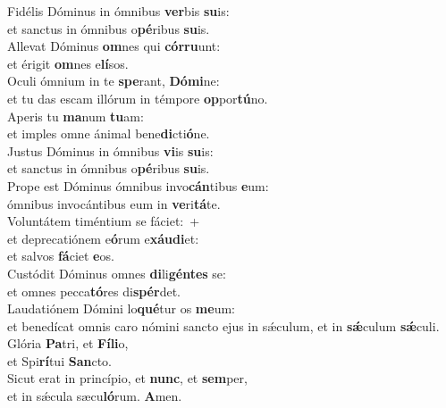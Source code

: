 \evenverse Fidélis Dóminus in ómnibus \textbf{ver}bis \textbf{su}is:~\*\\
\evenverse et sanctus in ómnibus o\textbf{pé}ribus \textbf{su}is.\\
\oddverse Allevat Dóminus \textbf{om}nes qui \textbf{cór}\textbf{ru}unt:~\*\\
\oddverse et érigit \textbf{om}nes e\textbf{lí}sos.\\
\evenverse Oculi ómnium in te \textbf{spe}rant, \textbf{Dó}\textbf{mi}ne:~\*\\
\evenverse et tu das escam illórum in témpore \textbf{op}por\textbf{tú}no.\\
\oddverse Aperis tu \textbf{ma}num \textbf{tu}am:~\*\\
\oddverse et imples omne ánimal bene\textbf{di}cti\textbf{ó}ne.\\
\evenverse Justus Dóminus in ómnibus \textbf{vi}is \textbf{su}is:~\*\\
\evenverse et sanctus in ómnibus o\textbf{pé}ribus \textbf{su}is.\\
\oddverse Prope est Dóminus ómnibus invo\textbf{cán}tibus \textbf{e}um:~\*\\
\oddverse ómnibus invocántibus eum in \textbf{ve}ri\textbf{tá}te.\\
\evenverse Voluntátem timéntium se fáciet:~+\\
\evenverse  et deprecatiónem e\textbf{ó}rum e\textbf{xáu}\textbf{di}et:~\*\\
\evenverse et salvos \textbf{fá}ciet \textbf{e}os.\\
\oddverse Custódit Dóminus omnes \textbf{di}li\textbf{gén}\textbf{tes} se:~\*\\
\oddverse et omnes pecca\textbf{tó}res di\textbf{spér}det.\\
\evenverse Laudatiónem Dómini lo\textbf{qué}tur os \textbf{me}um:~\*\\
\evenverse et benedícat omnis caro nómini sancto ejus in sǽculum, et in \textbf{sǽ}culum \textbf{sǽ}culi.\\
\oddverse Glória \textbf{Pa}tri, et \textbf{Fí}\textbf{li}o,~\*\\
\oddverse et Spi\textbf{rí}tui \textbf{San}cto.\\
\evenverse Sicut erat in princípio, et \textbf{nunc}, et \textbf{sem}per,~\*\\
\evenverse et in sǽcula sæcu\textbf{ló}rum. \textbf{A}men.\\
